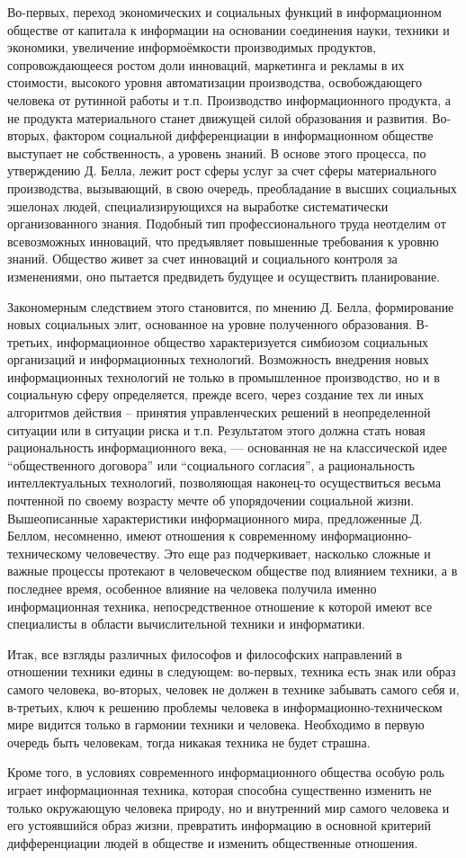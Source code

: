 Во-первых, переход экономических и социальных функций в информационном обществе от капитала к информации на основании соединения науки, техники и экономики, увеличение информоёмкости производимых продуктов, сопровождающееся ростом доли инноваций, маркетинга и рекламы в их стоимости, высокого уровня автоматизации производства, освобождающего человека от рутинной работы и т.п. Производство информационного продукта, а не продукта материального станет движущей силой образования и развития.  Во-вторых, фактором социальной дифференциации в информационном обществе выступает не собственность, а уровень знаний. В основе этого процесса, по утверждению Д. Белла, лежит рост сферы услуг за счет сферы материального производства, вызывающий, в свою очередь, преобладание в высших социальных эшелонах людей, специализирующихся на выработке систематически организованного знания. Подобный тип профессионального труда неотделим от всевозможных инноваций, что предъявляет повышенные требования к уровню знаний. Общество живет за счет инноваций и социального контроля за изменениями, оно пытается предвидеть будущее и осуществить планирование.

Закономерным следствием этого становится, по мнению Д. Белла, формирование новых социальных элит, основанное на уровне полученного образования.  В-третьих, информационное общество характеризуется симбиозом социальных организаций и информационных технологий. Возможность внедрения новых информационных технологий не только в промышленное производство, но и в социальную сферу определяется, прежде всего, через создание тех ли иных алгоритмов действия – принятия управленческих решений в неопределенной ситуации или в ситуации риска и т.п. Результатом этого должна стать новая рациональность информационного века, — основанная не на классической идее ``общественного договора'' или ``социального согласия'', а рациональность интеллектуальных технологий, позволяющая наконец-то осуществиться весьма почтенной по своему возрасту мечте об упорядочении социальной жизни.  Вышеописанные характеристики информационного мира, предложенные Д. Беллом, несомненно, имеют отношения к современному информационно-техническому человечеству. Это еще раз подчеркивает, насколько сложные и важные процессы протекают в человеческом обществе под влиянием техники, а в последнее время, особенное влияние на человека получила именно информационная техника, непосредственное отношение к которой имеют все специалисты в области вычислительной техники и информатики.

Итак, все взгляды различных философов и философских направлений в отношении техники едины в следующем: во-первых, техника есть знак или образ самого человека, во-вторых, человек не должен в технике забывать самого себя и, в-третьих, ключ к решению проблемы человека в информационно-техническом мире видится только в гармонии техники и человека. Необходимо в первую очередь быть человекам, тогда никакая техника не будет страшна.

Кроме того, в условиях современного информационного общества особую роль играет информационная техника, которая способна существенно изменить не только окружающую человека природу, но и внутренний мир самого человека и его устоявшийся образ жизни, превратить информацию в основной критерий дифференциации людей в обществе и изменить общественные отношения. 
